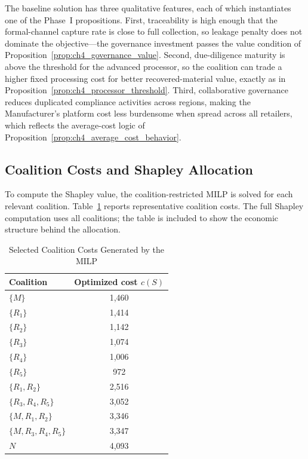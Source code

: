 The baseline solution has three qualitative features, each of which instantiates one of the Phase~I propositions. First, traceability is high enough that the formal-channel capture rate is close to full collection, so leakage penalty does not dominate the objective---the governance investment passes the value condition of Proposition~\ref{prop:ch4_governance_value}. Second, due-diligence maturity is above the threshold for the advanced processor, so the coalition can trade a higher fixed processing cost for better recovered-material value, exactly as in Proposition~\ref{prop:ch4_processor_threshold}. Third, collaborative governance reduces duplicated compliance activities across regions, making the Manufacturer's platform cost less burdensome when spread across all retailers, which reflects the average-cost logic of Proposition~\ref{prop:ch4_average_cost_behavior}.

\subsection{Coalition Costs and Shapley Allocation}

To compute the Shapley value, the coalition-restricted MILP is solved for each relevant coalition. Table~\ref{tab:coalition_costs} reports representative coalition costs. The full Shapley computation uses all coalitions; the table is included to show the economic structure behind the allocation.

\begin{table}[htbp]
\centering
\caption{Selected Coalition Costs Generated by the MILP}
\label{tab:coalition_costs}
\begin{tabular}{lc}
\toprule
\textbf{Coalition} & \textbf{Optimized cost $c(S)$} \\
\midrule
$\{M\}$ & 1,460 \\
$\{R_1\}$ & 1,414 \\
$\{R_2\}$ & 1,142 \\
$\{R_3\}$ & 1,074 \\
$\{R_4\}$ & 1,006 \\
$\{R_5\}$ & 972 \\
$\{R_1,R_2\}$ & 2,516 \\
$\{R_3,R_4,R_5\}$ & 3,052 \\
$\{M,R_1,R_2\}$ & 3,346 \\
$\{M,R_3,R_4,R_5\}$ & 3,347 \\
$N$ & 4,093 \\
\bottomrule
\end{tabular}
\end{table}

